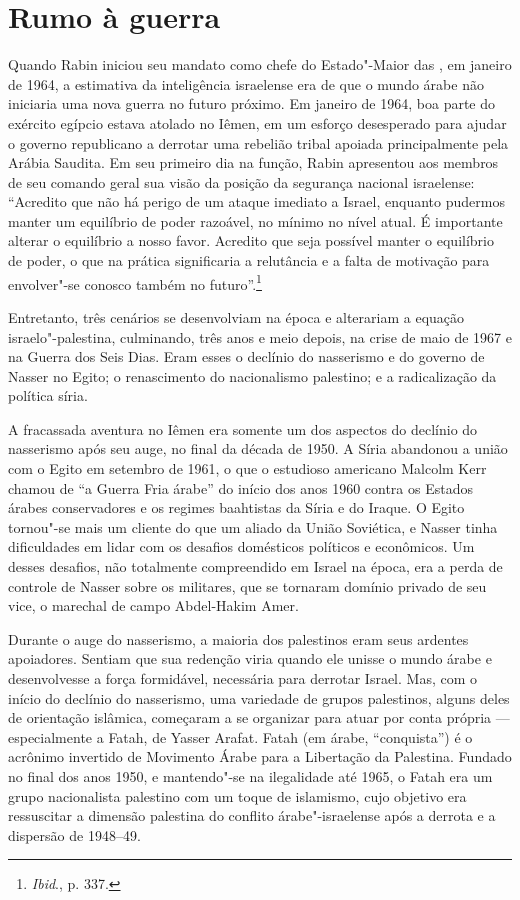 \section{Rumo à guerra}

Quando Rabin iniciou seu mandato como chefe do Estado"-Maior das , em
janeiro de 1964, a estimativa da inteligência israelense era de que o
mundo árabe não iniciaria uma nova guerra no futuro próximo. Em janeiro
de 1964, boa parte do exército egípcio estava atolado no Iêmen, em um
esforço desesperado para ajudar o governo republicano a derrotar uma
rebelião tribal apoiada principalmente pela Arábia Saudita. Em seu
primeiro dia na função, Rabin apresentou aos membros de seu comando
geral sua visão da posição da segurança nacional israelense: ``Acredito
que não há perigo de um ataque imediato a Israel, enquanto pudermos
manter um equilíbrio de poder razoável, no mínimo no nível atual. É
importante alterar o equilíbrio a nosso favor. Acredito que seja
possível manter o equilíbrio de poder, o que na prática significaria a
relutância e a falta de motivação para envolver"-se conosco também no
futuro''.\footnote{\emph{Ibid}., p. 337.}

Entretanto, três cenários se desenvolviam na época e alterariam a
equação israelo"-palestina, culminando, três anos e meio depois, na crise
de maio de 1967 e na Guerra dos Seis Dias. Eram esses o declínio do
nasserismo e do governo de Nasser no Egito; o renascimento do
nacionalismo palestino; e a radicalização da política síria.

A fracassada aventura no Iêmen era somente um dos aspectos do declínio
do nasserismo após seu auge, no final da década de 1950. A Síria
abandonou a união com o Egito em setembro de 1961, o que o
estudioso americano Malcolm Kerr chamou de ``a Guerra Fria árabe'' do
início dos anos 1960 contra os Estados árabes conservadores e os regimes
baahtistas da Síria e do Iraque. O Egito tornou"-se mais um cliente do que
um aliado da União Soviética, e Nasser tinha dificuldades em lidar com
os desafios domésticos políticos e econômicos. Um desses desafios, não
totalmente compreendido em Israel na época, era a perda de controle de
Nasser sobre os militares, que se tornaram domínio privado de seu vice,
o marechal de campo Abdel-Hakim Amer.

Durante o auge do nasserismo, a maioria dos palestinos eram seus
ardentes apoiadores. Sentiam que sua redenção viria quando ele
unisse o mundo árabe e desenvolvesse a força formidável, necessária para
derrotar Israel. Mas, com o início do declínio do nasserismo, uma
variedade de grupos palestinos, alguns deles de orientação islâmica,
começaram a se organizar para atuar por conta própria --- especialmente a
Fatah, de Yasser Arafat. Fatah (em árabe, ``conquista'') é o acrônimo
invertido de Movimento Árabe para a Libertação da Palestina. Fundado no
final dos anos 1950, e mantendo"-se na ilegalidade até 1965, o Fatah era
um grupo nacionalista palestino com um toque de islamismo, cujo objetivo
era ressuscitar a dimensão palestina do conflito árabe"-israelense após a
derrota e a dispersão de 1948--49.

